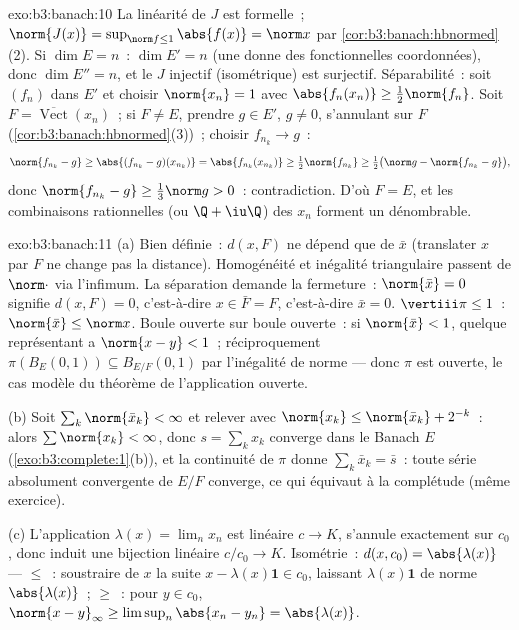 \begin{solution}{exo:b3:banach:10}
La linéarité de $J$ est formelle~; $\norm{J(x)} =
\sup_{\norm f \leq 1}\abs{f(x)} = \norm x$ par
\cref{cor:b3:banach:hbnormed}(2). Si $\dim E = n$~: $\dim E'
= n$ (une  donne des fonctionnelles coordonnées), donc
$\dim E'' = n$, et le $J$ injectif (isométrique) est
surjectif. Séparabilité~: soit $(f_n)$  dans $E'$ et
choisir $\norm{x_n} = 1$ avec $\abs{f_n(x_n)} \geq
\frac12\norm{f_n}$. Soit $F =
\overline{\operatorname{Vect}}(x_n)$~; si $F \neq E$, prendre
$g \in E'$, $g \neq 0$, s'annulant sur $F$
(\cref{cor:b3:banach:hbnormed}(3))~; choisir $f_{n_k} \to
g$~:
\[
\norm{f_{n_k} - g} \geq \abs{(f_{n_k} - g)(x_{n_k})}
= \abs{f_{n_k}(x_{n_k})} \geq \tfrac12\norm{f_{n_k}}
\geq \tfrac12\bigl(\norm g - \norm{f_{n_k} - g}\bigr),
\]
donc $\norm{f_{n_k} - g} \geq \frac13\norm g > 0$~:
contradiction. D'où $F = E$, et les combinaisons rationnelles
(ou $\Q + \iu\Q$) des $x_n$ forment un  dénombrable.
\end{solution}

\begin{solution}{exo:b3:banach:11}
(a) Bien définie~: $d(x, F)$ ne dépend que de $\bar x$
(translater $x$ par $F$ ne change pas la distance).
Homogénéité et inégalité triangulaire passent de $\norm\cdot$
via l'infimum. La séparation demande la fermeture~:
$\norm{\bar x} = 0$ signifie $d(x, F) = 0$, c'est-à-dire $x
\in \bar F = F$, c'est-à-dire $\bar x = 0$. $\vertiii\pi \leq
1$~: $\norm{\bar x} \leq \norm x$. Boule ouverte sur boule
ouverte~: si $\norm{\bar x} < 1$, quelque représentant a
$\norm{x - y} < 1$~; réciproquement $\pi(B_E(0,1)) \subseteq
B_{E/F}(0,1)$ par l'inégalité de norme --- donc $\pi$ est
ouverte, le cas modèle du théorème de l'application ouverte.

(b) Soit $\sum_k\norm{\bar x_k} < \infty$ et relever avec
$\norm{x_k} \leq \norm{\bar x_k} + 2^{-k}$~: alors
$\sum\norm{x_k} < \infty$, donc $s = \sum_kx_k$ converge dans
le Banach $E$ (\cref{exo:b3:complete:1}(b)), et la continuité
de $\pi$ donne $\sum_k\bar x_k = \bar s$~: toute série
absolument convergente de $E/F$ converge, ce qui équivaut à
la complétude (même exercice).

(c) L'application $\lambda(x) = \lim_nx_n$ est linéaire $c
\to K$, s'annule exactement sur $c_0$, donc induit une
bijection linéaire $c/c_0 \to K$. Isométrie~: $d(x, c_0) =
\abs{\lambda(x)}$ --- $\leq$~: soustraire de $x$ la suite $x
- \lambda(x)\mathbf 1 \in c_0$, laissant $\lambda(x)\mathbf
1$ de norme $\abs{\lambda(x)}$~; $\geq$~: pour $y \in c_0$,
$\norm{x - y}_\infty \geq \limsup_n\abs{x_n - y_n} =
\abs{\lambda(x)}$.
\end{solution}

